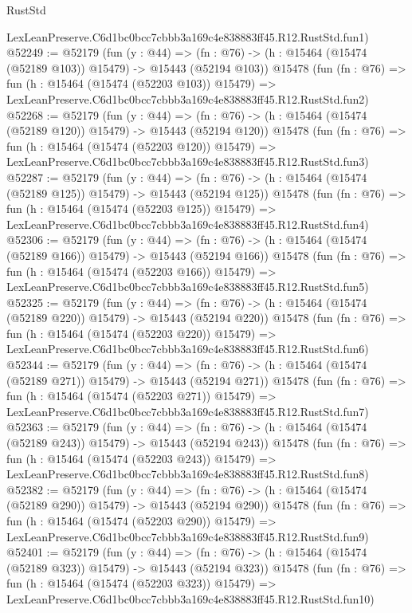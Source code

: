 \begin{lexlean}{RustStd}
\begin{coremodule}
    LexLeanPreserve.C6d1bc0bcc7cbbb3a169c4e838883ff45.R12.RustStd.fun1)
@52249 := @52179
    (fun (y : @44) =>
    (fn : @76) -> (h : @15464 (@15474 (@52189 @103)) @15479) -> @15443 (@52194 @103))
    @15478
    (fun (fn : @76) =>
    fun (h : @15464 (@15474 (@52203 @103)) @15479) =>
    LexLeanPreserve.C6d1bc0bcc7cbbb3a169c4e838883ff45.R12.RustStd.fun2)
@52268 := @52179
    (fun (y : @44) =>
    (fn : @76) -> (h : @15464 (@15474 (@52189 @120)) @15479) -> @15443 (@52194 @120))
    @15478
    (fun (fn : @76) =>
    fun (h : @15464 (@15474 (@52203 @120)) @15479) =>
    LexLeanPreserve.C6d1bc0bcc7cbbb3a169c4e838883ff45.R12.RustStd.fun3)
@52287 := @52179
    (fun (y : @44) =>
    (fn : @76) -> (h : @15464 (@15474 (@52189 @125)) @15479) -> @15443 (@52194 @125))
    @15478
    (fun (fn : @76) =>
    fun (h : @15464 (@15474 (@52203 @125)) @15479) =>
    LexLeanPreserve.C6d1bc0bcc7cbbb3a169c4e838883ff45.R12.RustStd.fun4)
@52306 := @52179
    (fun (y : @44) =>
    (fn : @76) -> (h : @15464 (@15474 (@52189 @166)) @15479) -> @15443 (@52194 @166))
    @15478
    (fun (fn : @76) =>
    fun (h : @15464 (@15474 (@52203 @166)) @15479) =>
    LexLeanPreserve.C6d1bc0bcc7cbbb3a169c4e838883ff45.R12.RustStd.fun5)
@52325 := @52179
    (fun (y : @44) =>
    (fn : @76) -> (h : @15464 (@15474 (@52189 @220)) @15479) -> @15443 (@52194 @220))
    @15478
    (fun (fn : @76) =>
    fun (h : @15464 (@15474 (@52203 @220)) @15479) =>
    LexLeanPreserve.C6d1bc0bcc7cbbb3a169c4e838883ff45.R12.RustStd.fun6)
@52344 := @52179
    (fun (y : @44) =>
    (fn : @76) -> (h : @15464 (@15474 (@52189 @271)) @15479) -> @15443 (@52194 @271))
    @15478
    (fun (fn : @76) =>
    fun (h : @15464 (@15474 (@52203 @271)) @15479) =>
    LexLeanPreserve.C6d1bc0bcc7cbbb3a169c4e838883ff45.R12.RustStd.fun7)
@52363 := @52179
    (fun (y : @44) =>
    (fn : @76) -> (h : @15464 (@15474 (@52189 @243)) @15479) -> @15443 (@52194 @243))
    @15478
    (fun (fn : @76) =>
    fun (h : @15464 (@15474 (@52203 @243)) @15479) =>
    LexLeanPreserve.C6d1bc0bcc7cbbb3a169c4e838883ff45.R12.RustStd.fun8)
@52382 := @52179
    (fun (y : @44) =>
    (fn : @76) -> (h : @15464 (@15474 (@52189 @290)) @15479) -> @15443 (@52194 @290))
    @15478
    (fun (fn : @76) =>
    fun (h : @15464 (@15474 (@52203 @290)) @15479) =>
    LexLeanPreserve.C6d1bc0bcc7cbbb3a169c4e838883ff45.R12.RustStd.fun9)
@52401 := @52179
    (fun (y : @44) =>
    (fn : @76) -> (h : @15464 (@15474 (@52189 @323)) @15479) -> @15443 (@52194 @323))
    @15478
    (fun (fn : @76) =>
    fun (h : @15464 (@15474 (@52203 @323)) @15479) =>
    LexLeanPreserve.C6d1bc0bcc7cbbb3a169c4e838883ff45.R12.RustStd.fun10)

\end{coremodule}
\end{lexlean}
